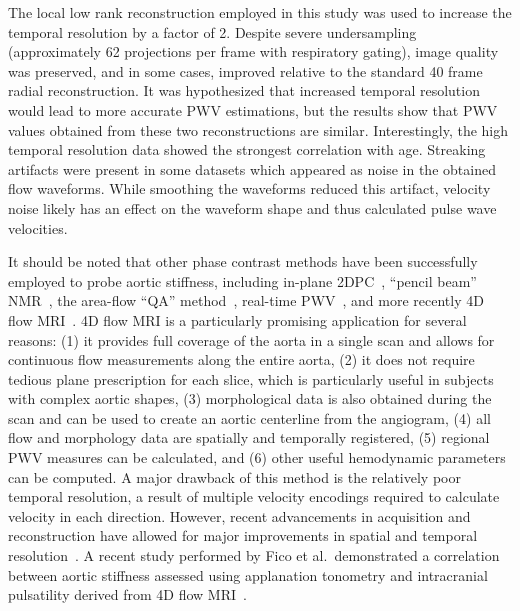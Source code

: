 The local low rank reconstruction employed in this study was used to increase the temporal resolution by a factor of 2. Despite severe undersampling (approximately 62 projections per frame with respiratory gating), image quality was preserved, and in some cases, improved relative to the standard 40 frame radial reconstruction. It was hypothesized that increased temporal resolution would lead to more accurate PWV estimations, but the results show that PWV values obtained from these two reconstructions are similar. Interestingly, the high temporal resolution data showed the strongest correlation with age. Streaking artifacts were present in some datasets which appeared as noise in the obtained flow waveforms. While smoothing the waveforms reduced this artifact, velocity noise likely has an effect on the waveform shape and thus calculated pulse wave velocities. 

It should be noted that other phase contrast methods have been successfully employed to probe aortic stiffness, including in-plane 2DPC~\cite{westenbergImprovedAorticPulse2010}, “pencil beam” NMR~\cite{hardyPencilExcitationInterleaved1996}, the area-flow “QA” method~\cite{vulliemozEstimationLocalAortic2002}, real-time PWV~\cite{robertsRealtimeAorticPulse2015}, and more recently 4D flow MRI~\cite{dyverfeldtPulseWaveVelocity2014}. 4D flow MRI is a particularly promising application for several reasons: (1) it provides full coverage of the aorta in a single scan and allows for continuous flow measurements along the entire aorta, (2) it does not require tedious plane prescription for each slice, which is particularly useful in subjects with complex aortic shapes, (3) morphological data is also obtained during the scan and can be used to create an aortic centerline from the angiogram, (4) all flow and morphology data are spatially and temporally registered, (5) regional PWV measures can be calculated, and (6) other useful hemodynamic parameters can be computed. A major drawback of this method is the relatively poor temporal resolution, a result of multiple velocity encodings required to calculate velocity in each direction. However, recent advancements in acquisition and reconstruction have allowed for major improvements in spatial and temporal resolution~\cite{valvanoAccelerating4DFlow2017,rivera-riveraAssessmentVascularStiffness2021}. A recent study performed by Fico et al.\ demonstrated a correlation between aortic stiffness assessed using applanation tonometry and intracranial pulsatility derived from 4D flow MRI~\cite{ficoImpactAgingAssociation2022}. 

